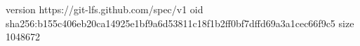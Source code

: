 version https://git-lfs.github.com/spec/v1
oid sha256:b155c406eb20ca14925e1bf9a6d53811c18f1b2ff0bf7dffd69a3a1cec66f9c5
size 1048672
